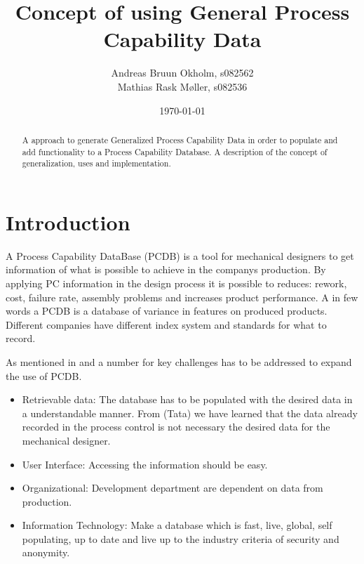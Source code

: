 \documentclass[aip,amsmath, reprint, author-year]{revtex4-1}
\begin{document}
\begin{abstract}
A approach to generate Generalized Process Capability Data in order to populate and add functionality to a Process Capability Database.
A description of the concept of generalization, uses and implementation.
\end{abstract}

\title{Concept of using General Process Capability Data}
\author{Andreas Bruun Okholm, s082562\\
Mathias Rask Møller, s082536 }
 
\date{\today}
\maketitle


\section{Introduction}

A Process Capability DataBase (PCDB)  is a tool for mechanical designers to get information of what is possible to achieve in the companys production. By applying PC information in the design process it is possible to reduces: rework, cost, failure rate, assembly problems and increases product performance.
A in few words a PCDB is a database of variance in features on produced products. Different companies have different index system and standards for what to record. 

As mentioned in \citep{tata1999process, tata1999effective, raskokholm} and a number for key challenges has to be addressed to expand the use of PCDB.
\begin{itemize}
	\item Retrievable data: The database has to be populated with the desired data in a understandable manner. From (Tata) we have learned that the data already recorded in the process control is not necessary the desired data for the mechanical designer. 
	\item User Interface: Accessing the information should be easy.
	\item Organizational: Development department are dependent on data from production. 
	\item Information Technology: Make a database which is fast, live, global, self populating, up to date and live up to the industry criteria of security and anonymity.
\end{itemize}
\end{document}
